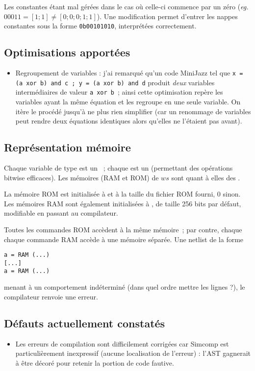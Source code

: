 \documentclass[11pt,a4paper]{article}
\begin{document}
Les constantes  étant mal gérées dans le cas où celle-ci commence par un zéro (\textit{eg.} $00011 = [1;1] \neq [0;0;0;1;1]$). Une modification permet d'entrer les nappes constantes sous la forme \lstinline`0b00101010`, interprétées correctement.

\subsection{Optimisations apportées} \label{sec:opti}

\begin{itemize}
\item Regroupement de variables : j'ai remarqué qu'un code MiniJazz tel que \lstinline`x = (a xor b) and c ; y = (a xor b) and d` produit \emph{deux} variables intermédiaires de valeur \lstinline`a xor b`~; ainsi cette optimisation repère les variables ayant la même équation et les regroupe en une seule variable. On itère le procédé jusqu'à ne plus rien simplifier (car un renommage de variables peut rendre deux équations identiques alors qu'elles ne l'étaient pas avant).
\end{itemize}

\subsection{Représentation mémoire} \label{sec:memory}

Chaque variable de type  est un ~; chaque  est un  (permettant des opérations bitwise efficaces). Les mémoires (RAM et ROM) de  $ws$ sont quant à elles des .

La mémoire ROM est initialisée à  et à la taille du fichier ROM fourni, 0 sinon. Les mémoires RAM sont également initialisées à , de taille 256 bits par défaut, modifiable en passant  au compilateur.

Toutes les commandes ROM accèdent à la même mémoire~; par contre, chaque chaque commande RAM accède à une mémoire séparée. Une netlist de la forme
\begin{lstlisting}
a = RAM (...)
[...]
a = RAM (...)
\end{lstlisting}
menant à un comportement indéterminé (dans quel ordre mettre les lignes ?), le compilateur renvoie une erreur.

\subsection{Défauts actuellement constatés}

\begin{itemize}
\item Les erreurs de compilation sont difficilement corrigées car Simcomp est particulièrement inexpressif (aucune localisation de l'erreur) : l'AST gagnerait à être décoré pour retenir la portion de code fautive.
\end{itemize}
\end{document}
